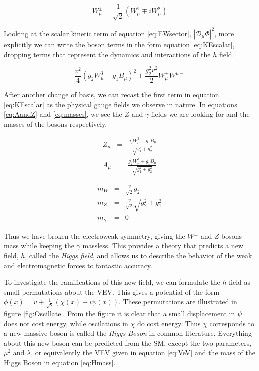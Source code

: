 \begin{equation}
\label{eq:Wpm}
W^{\pm}_{\mu}  =  \frac{1}{\sqrt{2}}\left(W_{\mu}^{1} \mp i W_{\mu}^{2}\right)
\end{equation}

Looking at the scalar kinetic term of equation \eqref{eq:EWsector}, $\left|\mathcal{D}_{\mu}\Phi\right|^{2}$, more explicitly we can write the boson terms in the form equation \eqref{eq:KEscalar}, dropping terms that represent the dynamics and interactions of the $h$ field.

\begin{equation}
\label{eq:KEscalar} 
\frac{v^2}{4}\left(g_{2}W_{\mu}^{3} - g_{1}B_{\mu}\right)^2 + \frac{g_{2}^{2}v^{2}}{2}W_{\mu}^{+}W^{\mu -}
\end{equation}

After another change of basis, we can recast the first term in equation \eqref{eq:KEscalar} as the physical gauge fields we observe in nature. In equations \eqref{eq:AandZ} and \eqref{eq:masses}, we see the $Z$ and $\gamma$ fields we are looking for and the masses of the bosons respectively. 

\begin{eqnarray}
\label{eq:AandZ}
Z_{\mu}  &=&  \frac{g_{2}W^{3}_{\mu} - g_{1}B_{\mu}}{\sqrt{g_{1}^{2}+g_{2}^{2}}} \nonumber \\
A_{\mu}  &=&  \frac{g_{2}W^{3}_{\mu} + g_{1}B_{\mu}}{\sqrt{g_{1}^{2}+g_{2}^{2}}}
\end{eqnarray}

\begin{eqnarray}
\label{eq:masses}
m_{W} & = & \frac{v}{\sqrt{2}}g_{2} \nonumber \\
m_{Z} & = & \frac{v}{\sqrt{2}}\sqrt{g_{2}^{2} + g_{1}^{2}} \\
m_{\gamma} & = & 0 \nonumber 
\end{eqnarray}

Thus we have broken the electroweak symmetry, giving the $W^{\pm}$ and $Z$ bosons mass while keeping the $\gamma$ massless. This provides a theory that predicts a new field, $h$, called the \textit{Higgs field}, and allows us to describe the behavior of the weak and electromagnetic forces to fantastic accuracy. 

To investigate the ramifications of this new field, we can formulate the $h$ field as small permutations about the VEV. This gives a potential of the form $\phi\left(x\right) = v + \frac{1}{\sqrt{2}}\left(\chi\left(x\right) + i\psi\left(x\right)\right)$. These permutations are illustrated in figure \ref{fig:Oscillate}. From the figure it is clear that a small displacement in $\psi$ does not cost energy, while oscilations in $\chi$ do cost energy. Thus $\chi$ corresponds to a new massive boson is called the \textit{Higgs Boson} in common literature. Everything about this new boson can be predicted from the SM, except the two parameters, $\mu^{2}$ and $\lambda$, or equivalently the VEV given in equation \eqref{eq:VeV} and the mass of the Higgs Boson in equation \eqref{eq:Hmass}.

